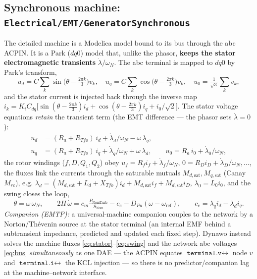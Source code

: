 \documentclass[11pt]{article}
\begin{document}
\subsection{Synchronous machine: \texttt{Electrical/EMT/GeneratorSynchronous}}
The detailed machine is a Modelica model bound to its bus through the abc ACPIN.
It is a Park ($dq0$) model that, unlike the phasor, \textbf{keeps the stator
electromagnetic transients} $\dot\lambda/\omega_N$. The abc terminal is mapped to
$dq0$ by Park's transform,
\begin{equation}
u_d=C\!\sum_k\sin\!\big(\theta-\tfrac{2\pi k}{3}\big)v_k,\quad
u_q=C\!\sum_k\cos\!\big(\theta-\tfrac{2\pi k}{3}\big)v_k,\quad
u_0=\tfrac{1}{\sqrt3}\textstyle\sum_k v_k,
\label{eq:park}
\end{equation}
and the stator current is injected back through the inverse map
$i_k=K_i C_{dq}\big[\sin(\theta-\tfrac{2\pi k}{3})i_d+\cos(\theta-\tfrac{2\pi
k}{3})i_q+i_0/\sqrt2\big]$. The stator voltage equations \emph{retain} the
transient term (the EMT difference --- the phasor sets $\dot\lambda=0$):
\begin{align}
u_d&=(R_a+R_{Tfo})\,i_d+\dot\lambda_d/\omega_N-\omega\,\lambda_q,\nonumber\\
u_q&=(R_a+R_{Tfo})\,i_q+\dot\lambda_q/\omega_N+\omega\,\lambda_d,\qquad
u_0=R_a\,i_0+\dot\lambda_0/\omega_N,
\label{eq:stator}
\end{align}
the rotor windings ($f,D,Q_1,Q_2$) obey $u_f=R_f i_f+\dot\lambda_f/\omega_N$,
$0=R_D i_D+\dot\lambda_D/\omega_N,\dots$, the fluxes link the currents through the
saturable mutuals $M_{d,\mathrm{sat}},M_{q,\mathrm{sat}}$ (Canay $M_{rc}$), e.g.
$\lambda_d=(M_{d,\mathrm{sat}}+L_d+X_{Tfo})i_d+M_{d,\mathrm{sat}}i_f+M_{d,\mathrm{sat}}i_D$,
$\lambda_0=L_0 i_0$, and the swing closes the loop,
\begin{equation}
\dot\theta=\omega\,\omega_N,\qquad
2H\,\dot\omega=c_m\tfrac{P_{\text{NomTurb}}}{S_{\text{Nom}}}-c_e-D_{Pu}(\omega-\omega_{\text{ref}}),\qquad
c_e=\lambda_q i_d-\lambda_d i_q .
\label{eq:swing}
\end{equation}
\emph{Companion (EMTP):} a universal-machine companion couples to the network by
a Norton/Th\'evenin source at the stator terminal (an internal EMF behind a
subtransient impedance, predicted and updated each fixed step). Dynawo instead
solves the machine fluxes \eqref{eq:stator}--\eqref{eq:swing} and the network abc
voltages \eqref{eq:bus} \emph{simultaneously} as one DAE --- the ACPIN equates
$\texttt{terminal.v}\leftrightarrow$ node $v$ and
$\texttt{terminal.i}\leftrightarrow$ the KCL injection --- so there is no
predictor/companion lag at the machine--network interface.
\end{document}
